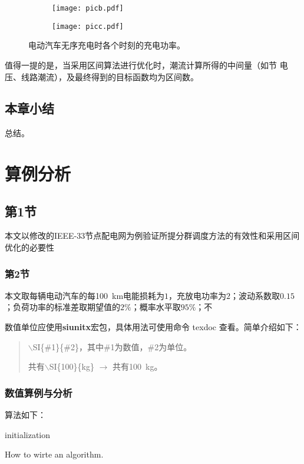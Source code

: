 \documentclass[bachelor]{NCEPU-thesis}
\begin{document}
\begin{figure}[h]
	\begin{subfigure}[b]{0.49\linewidth}
		\texttt{[image: picb.pdf]}
		\label{picb}
    \end{subfigure}
	\begin{subfigure}[b]{0.49\linewidth}
		\texttt{[image: picc.pdf]}
		\label{picc}
    \end{subfigure}
	\caption{电动汽车无序充电时各个时刻的充电功率。}
	\label{fig1}
\end{figure}

值得一提的是，当采用区间算法进行优化时，潮流计算所得的中间量（如节 电压、线路潮流），及最终得到的目标函数均为区间数。

\section{本章小结}
总结。


\chapter{算例分析}
\section{第1节}
本文以修改的IEEE-33节点配电网为例验证所提分群调度方法的有效性和采用区间优化的必要性
\subsection{第2节}
本文取每辆电动汽车的每\SI{100}{km}电能损耗为$1$，充放电功率为$2$；波动系数取$0.15$；负荷功率的标准差取期望值的$2\%$；概率水平取$95\%$；不

数值单位应使用\textbf{siunitx}宏包，具体用法可使用命令 texdoc 查看。简单介绍如下：
\begin{quote}
$\backslash$SI\{\#1\}\{\#2\}，其中\#1为数值，\#2为单位。

共有$\backslash$SI\{100\}\{kg\} $\rightarrow$ 共有\SI{100}{kg}。
\end{quote}

\subsection{数值算例与分析}
算法如下：

\begin{algorithm}[H]
 initialization\;
 \caption{How to wirte an algorithm.}
\end{algorithm}
\end{document}
